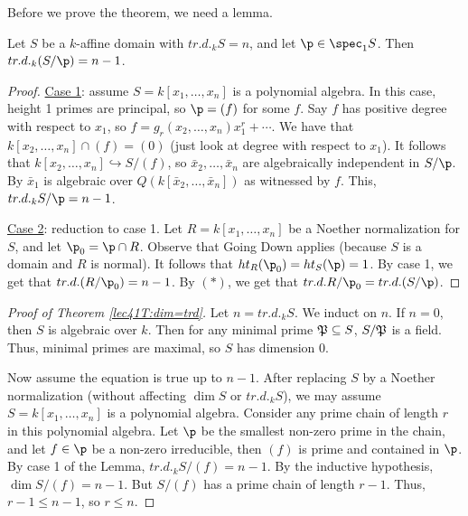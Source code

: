  Before we prove the theorem, we need a lemma.
 \begin{lemma}
   Let $S$ be a $k$-affine domain with $tr.d._k S=n$, and let $\p\in \spec_1 S$. Then
   $tr.d._k (S/\p)=n-1$.
 \end{lemma}
 \begin{proof}
   \underline{Case 1}: assume $S=k[x_1,\dots, x_n]$ is a polynomial algebra. In this
   case, height 1 primes are principal, so $\p=(f)$ for some $f$. Say $f$ has positive
   degree with respect to $x_1$, so $f = g_r(x_2,\dots, x_n)x_1^r + \cdots$. We have
   that $k[x_2,\dots, x_n]\cap (f)=(0)$ (just look at degree with respect to $x_1$). It
   follows that $k[x_2,\dots, x_n]\hookrightarrow S/(f)$, so $\bar x_2,\dots, \bar x_n$
   are algebraically independent in $S/\p$. By $\bar x_1$ is algebraic over $Q(k[\bar
   x_2,\dots, \bar x_n])$ as witnessed by $f$. This, $tr.d._k S/\p=n-1$.

   \underline{Case 2}: reduction to case 1. Let $R=k[x_1,\dots, x_n]$ be a Noether
   normalization for $S$, and let $\p_0=\p\cap R$. Observe that Going Down applies
   (because $S$ is a domain and $R$ is normal). It follows that $ht_R(\p_0)=ht_S(\p)=1$.
   By case 1, we get that $tr.d. (R/\p_0)=n-1$. By $(\ast)$, we get that $tr.d.
   R/\p_0=tr.d. (S/\p)$.
 \end{proof}
 \begin{proof}[Proof of Theorem \ref{lec41T:dim=trd}]
   Let $n=tr.d._k S$. We induct on $n$. If $n=0$, then $S$ is algebraic over $k$. Then
   for any minimal prime $\P\subseteq S$, $S/\P$ is a field. Thus, minimal primes are
   maximal, so $S$ has dimension 0.

   Now assume the equation is true up to $n-1$. After replacing $S$ by a Noether
   normalization (without affecting $\dim S$ or $tr.d._k S$), we may assume
   $S=k[x_1,\dots, x_n]$ is a polynomial algebra. Consider any prime chain of length $r$
   in this polynomial algebra. Let $\p$ be the smallest non-zero prime in the chain, and
   let $f\in \p$ be a non-zero irreducible, then $(f)$ is prime and contained in $\p$. By
   case 1 of the Lemma, $tr.d._k S/(f)=n-1$. By the inductive hypothesis, $\dim
   S/(f)=n-1$. But $S/(f)$ has a prime chain of length $r-1$. Thus, $r-1\le n-1$, so
   $r\le n$.
 \end{proof}
 \setcounter{lecture}{42}

